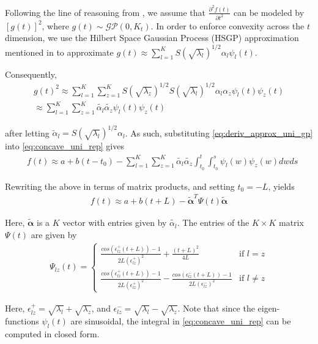 Following the line of reasoning from \cite{convexityconstraints}, we assume that $\frac{\partial ^2 f(t)}{\partial t^2}$ can be modeled by $[g(t)]^2$, where $g(t) \sim \mathcal{GP}(0, K_t)$. 
In order to enforce convexity across the $t$ dimension, we use the Hilbert Space Gaussian Process (HSGP) approximation mentioned in \cite{convexityconstraints} to approximate $g(t) \approx \sum_{l=1}^K S(\sqrt{\lambda_l})^{1/2} \alpha_l \psi_l(t)$.

Consequently,
\begin{align}
\label{eq:deriv_approx_uni_gp}
g(t)^2 \approx \sum_{l=1}^K \sum_{z=1}^K S(\sqrt{\lambda_z})^{1/2} S(\sqrt{\lambda_l})^{1/2} \alpha_l \alpha_z \psi_l(t) \psi_z(t)\nonumber \\
 \approx  \sum_{l=1}^K \sum_{z=1}^K\tilde{\alpha_l} \tilde{\alpha_z} \psi_l(t)\psi_z(t) 
\end{align}

after letting $\tilde{\alpha}_l = S(\sqrt{\lambda_l})^{1/2} \alpha_l $.
As such, substituting \eqref{eq:deriv_approx_uni_gp} into \eqref{eq:concave_uni_rep} gives
\begin{align}
    & f(t) \approx a + b(t-t_0) - \sum_{l=1}^K \sum_{z=1}^K\tilde{\alpha_l} \tilde{\alpha_z}  \int_{t_0}^t \int_{t_0}^s \psi_l(w)\psi_z(w)  dwds
\end{align}
 

Rewriting the above in terms of matrix products, and setting $t_0 = -L$,  yields
\begin{align}
\label{eq:final_gp_app_uni}
    f(t) \approx a + b(t+L) -  \mathbf{\tilde{\alpha}}^T \Psi(t) \mathbf{\tilde{\alpha}} 
\end{align} 


Here, $\mathbf{\tilde{\alpha}}$ is a $K$ vector with entries given by $\tilde{\alpha_l}$. 
The entries of the $K \times K$ matrix $\Psi(t)$ are given by
\begin{align}
\label{eq:phi_app}
\Psi_{lz}(t) =
\begin{cases} \frac{cos(\epsilon_{lz}^{+}(t+L)) - 1}{2L(\epsilon_{lz}^{+})^2} +
\frac{(t+L)^2}{4L}  & \text{if } l = z \\
\frac{cos(\epsilon_{lz}^{+}(t+L)) - 1}{2L(\epsilon_{lz}^{+})^2} - \frac{cos(\epsilon_{lz}^{-}(t+L)) - 1}{2L(\epsilon_{lz}^{-})^2} & \text{if } l \neq z
\end{cases}
\end{align}

Here, $\epsilon_{lz}^{+} = \sqrt{\lambda_l} + \sqrt{\lambda_z}$, and $\epsilon_{lz}^{-} = \sqrt{\lambda_l} - \sqrt{\lambda_z}$. Note that since the eigen-functions $\psi_l(t)$ are sinusoidal, the integral in \eqref{eq:concave_uni_rep} can be computed in closed form. 


